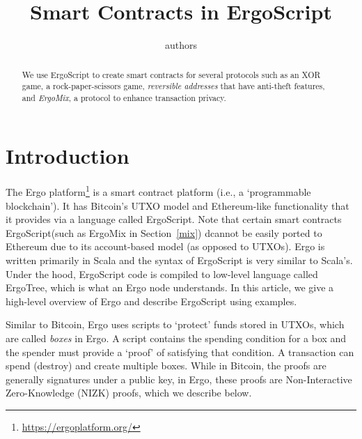 \documentclass[11pt]{article}
\newcommand{\langname}{ErgoScript\xspace}
\newcommand{\mixname}{ErgoMix\xspace}
\begin{document}
\title{Smart Contracts in \langname}


\author{authors}


\maketitle


\begin{abstract}
We use \langname to create smart contracts for several protocols such as an XOR game, a rock-paper-scissors game, {\em reversible addresses} that have anti-theft features, and {\em \mixname}, a protocol to enhance transaction privacy. 

\end{abstract}


\section{Introduction}

The Ergo platform\footnote{\url{https://ergoplatform.org/}} is a smart contract platform (i.e., a `programmable blockchain'). It has Bitcoin's UTXO model and Ethereum-like functionality that it provides via a language called \langname. Note that certain smart contracts \langname  (such as \mixname in Section~\ref{mix}) dcannot be easily ported to Ethereum due to its account-based model (as opposed to UTXOs). Ergo is written primarily in Scala and the syntax of \langname is very similar to Scala's. Under the hood, \langname code is compiled to low-level language called ErgoTree, which is what an Ergo node understands. In this article, we give a high-level overview of Ergo and describe \langname using examples.

Similar to Bitcoin, Ergo uses scripts to `protect' funds stored in UTXOs, which are called {\em boxes} in Ergo. A script contains the spending condition for a box and the spender must provide a `proof' of satisfying that condition. A transaction can spend (destroy) and create multiple boxes. While in Bitcoin, the proofs are generally signatures under a public key, in Ergo, these proofs are Non-Interactive Zero-Knowledge (NIZK) proofs, which we describe below.
\end{document}
